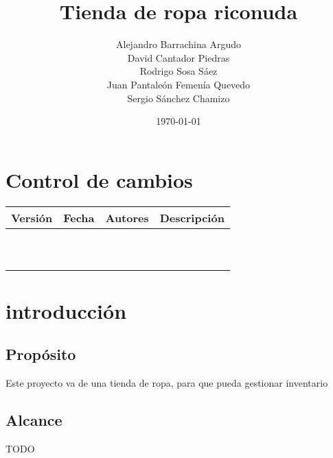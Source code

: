 \documentclass{article}
\title{Tienda de ropa riconuda}
\author{Alejandro Barrachina Argudo \\
David Cantador Piedras \\
Rodrigo Sosa Sáez \\
Juan Pantaleón Femenía Quevedo \\
Sergio Sánchez Chamizo  \\
}
\date{\today}
\begin{document}
\maketitle
\section*{Control de cambios} %
\noindent\begin{tabularx}{\textwidth}{ |l|l|p{5cm}|X| }
    \hline
    \textbf{Versión} & \textbf{Fecha} & \textbf{Autores} & \textbf{Descripción} \\
    \hline
                     &                &                  &                      \\
    \hline
                     &                &                  &                      \\
    \hline
                     &                &                  &                      \\
    \hline
                     &                &                  &                      \\
    \hline
                     &                &                  &                      \\
    \hline
                     &                &                  &                      \\
    \hline
                     &                &                  &                      \\
    \hline
                     &                &                  &                      \\
    \hline
                     &                &                  &                      \\
    \hline
                     &                &                  &                      \\
    \hline
\end{tabularx}


\section{introducción}
\subsection{Propósito}
Este proyecto va de una tienda de ropa, para que pueda gestionar inventario
\subsection{Alcance}
TODO
\end{document}

